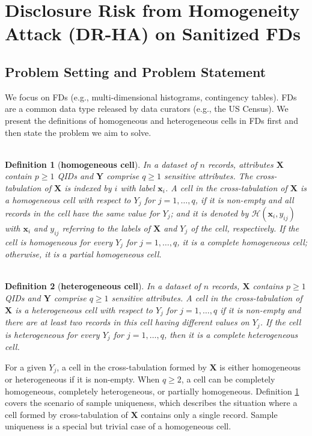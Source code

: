 \documentclass[10pt,journal,compsoc]{IEEEtran}
\newtheorem{defn}{\vspace{-6pt}\\ Definition}
\newcommand{\X}{\mathbf{X}}
\newcommand{\x}{\mathbf{x}}
\newcommand{\Y}{\mathbf{Y}}
\begin{document}
\section{Disclosure Risk from Homogeneity Attack (DR-HA) on  Sanitized FDs}\label{sec:DR-HA}\vspace{-3pt}
\subsection{Problem Setting and Problem  Statement} \label{sec:problem} \vspace{-3pt}
We focus on  FDs (e.g., multi-dimensional histograms,  contingency tables). FDs are a common data type released by data curators (e.g., the US Census). We present the definitions of homogeneous and heterogeneous cells in FDs first and then state the problem we aim to solve.

\vspace{-3pt}\begin{defn}[\textbf{homogeneous cell}] \label{def:homo}
In a dataset of $n$ records, attributes $\X$ contain $p\ge1$ QIDs and $\Y$ comprise $q\ge1$ sensitive attributes. The cross-tabulation of $\X$ is indexed by $i$ with label $\x_i$.  A cell in the cross-tabulation of $\X$ is  a \emph{homogeneous cell} with respect to $Y_j$ for  $j\!=\!1,\ldots,q$, if it is non-empty and all records in the cell have the same value for $Y_j$; and it is denoted by  $\mathcal{H}(\x_i,y_{ij})$ with $\x_i$ and $y_{ij}$ referring to the labels of $\X$ and $Y_j$ of the cell, respectively. If the cell is homogeneous for every $Y_j$ for $j\!=\!1,\ldots,q$, it is a \emph{complete homogeneous cell}; otherwise, it is a {partial homogeneous cell}.
\end{defn}\vspace{-3pt}

\begin{defn}[\textbf{heterogeneous cell}] \label{def:hetero}
In a dataset of $n$ records, $\X$ contains $p\ge1$ QIDs and $\Y$ comprise $q\ge1$ sensitive attributes. A cell in the cross-tabulation of $\X$ is a \emph{heterogeneous cell}  with respect to $Y_j$  for  $j=1,\ldots,q$ if it is non-empty and there are at least two records in this cell having different values on $Y_j$. If the cell is heterogeneous for every $Y_j$ for $j=1,\ldots,q$, then it is a \emph{complete heterogeneous cell}. 
\end{defn}
For a given $Y_j$, a cell in the cross-tabulation formed by $\X$ is either homogeneous or heterogeneous if it is non-empty.  When $q\ge2$, a cell can be completely homogeneous, completely heterogeneous, or partially homogeneous.  Definition \ref{def:homo} covers the scenario of sample uniqueness, which describes the situation where a cell formed by cross-tabulation of $\X$ contains only a single record. Sample uniqueness is a special but trivial case of a homogeneous cell. 
\end{document}
